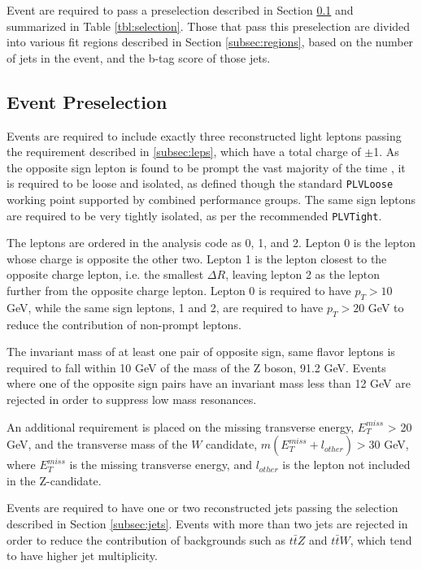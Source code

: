 
Event are required to pass a preselection described in Section \ref{subsec:presel} and summarized in Table \ref{tbl:selection}. Those that pass this preselection are divided into various fit regions described in Section \ref{subsec:regions}, based on the number of jets in the event, and the b-tag score of those jets.

\subsection{Event Preselection}
\label{subsec:presel}

Events are required to include exactly three reconstructed light leptons passing the requirement described in \ref{subsec:leps}, which have a total charge of $\pm$1. As the opposite sign lepton is found to be prompt the vast majority of the time \cite{ttH_paper}, it is required to be loose and isolated, as defined though the standard \verb|PLVLoose| working point supported by combined performance groups. The same sign leptons are required to be very tightly isolated, as per the recommended \verb|PLVTight|.

The leptons are ordered in the analysis code as 0, 1, and 2. Lepton 0 is the lepton whose charge is opposite the other two. Lepton 1 is the lepton closest to the opposite charge lepton, i.e. the smallest $\Delta R$, leaving lepton 2 as the lepton further from the opposite charge lepton. Lepton 0 is required to have $p_T > 10$ GeV, while the same sign leptons, 1 and 2, are required to have $p_T > 20$ GeV to reduce the contribution of non-prompt leptons.  

The invariant mass of at least one pair of opposite sign, same flavor leptons is required to fall within 10 GeV of the mass of the Z boson, 91.2 GeV. Events where one of the opposite sign pairs have an invariant mass less than 12 GeV are rejected in order to suppress low mass resonances. %

An additional requirement is placed on the missing transverse energy, $E^{miss}_T$ > 20 GeV, and the transverse mass of the $W$ candidate, $m(E^{miss}_T + l_{other}) > 30$ GeV, where $E^{miss}_T$ is the missing transverse energy, and $l_{other}$ is the lepton not included in the Z-candidate. 

Events are required to have one or two reconstructed jets passing the selection described in Section \ref{subsec:jets}. Events with more than two jets are rejected in order to reduce the contribution of backgrounds such as $t\bar{t}Z$ and $t\bar{t}W$, which tend to have higher jet multiplicity. 

